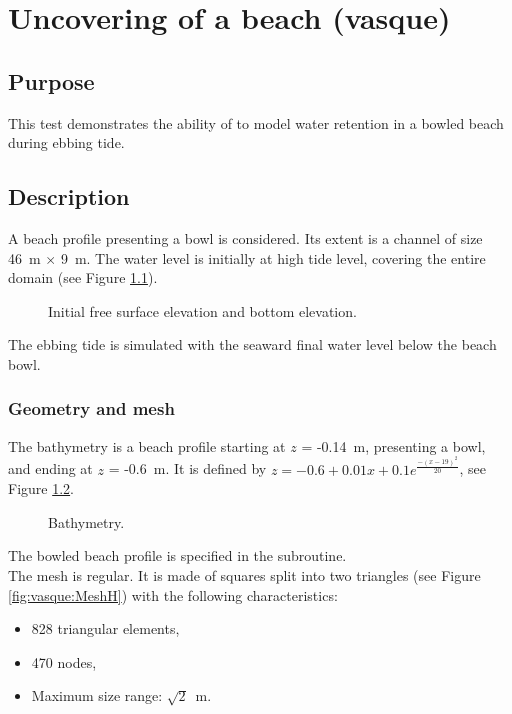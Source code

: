 \chapter{Uncovering of a beach (vasque)}

\section{Purpose}

This test demonstrates the ability of  to model water
retention in a bowled beach during ebbing tide.

\section{Description}

A beach profile presenting a bowl is considered.
Its extent is a channel of size 46~m $\times$ 9~m.
The water level is initially at high tide level,
covering the entire domain (see Figure \ref{fig:vasque:FSinit}).

\begin{figure}[H]
 \centering
  \caption{Initial free surface elevation and bottom elevation.}\label{fig:vasque:FSinit}
\end{figure}

The ebbing tide is simulated with the seaward final water level below
the beach bowl.

\subsection{Geometry and mesh}

The bathymetry is a beach profile starting at $z$ = -0.14~m, presenting
a bowl, and ending at $z$ = -0.6~m.
It is defined by $z = -0.6+0.01x+0.1e^{\frac{-(x-19)^2}{20}}$,
see Figure \ref{fig:vasque:Bottom}.

\begin{figure}[H]
 \centering
  \caption{Bathymetry.}\label{fig:vasque:Bottom}
\end{figure}

The bowled beach profile is specified in the 
subroutine.\\

The mesh is regular. It is made of squares split into two triangles
(see Figure \ref{fig:vasque:MeshH}) with the following characteristics:
\begin{itemize}
\item 828 triangular elements,
\item 470 nodes,
\item Maximum size range: $\sqrt{2}$~m.
\end{itemize}

